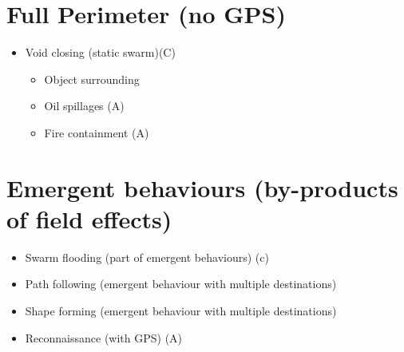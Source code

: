 \documentclass[a4paper,11pt,nocenter,bold,notitlepage,noheadline,noindent]{
thesis}
\begin{document}
\section{Full Perimeter (no GPS)}
\begin{itemize}
\setlength\itemsep{0em}
  	\item Void closing (static swarm)(C)\cite{ZFG:13,GN:08,IT:10,RS:08,RS:09}
	\begin{itemize}
   \setlength\itemsep{0em}
   	\item Object surrounding \cite{ZFG:13}
	 	\item Oil spillages (A)
		\item Fire containment (A)
	\end{itemize}
\end{itemize}

\section{Emergent behaviours (by-products of field effects)}
\begin{itemize}
\setlength\itemsep{0em}
	\item Swarm flooding (part of emergent behaviours) (c) \cite{BH:00,RWBK:15}
	\item Path following (emergent behaviour with multiple destinations)
	\item Shape forming (emergent behaviour with multiple destinations)	
	\item Reconnaissance (with GPS) (A)
\end{itemize}
%


\end{document}
